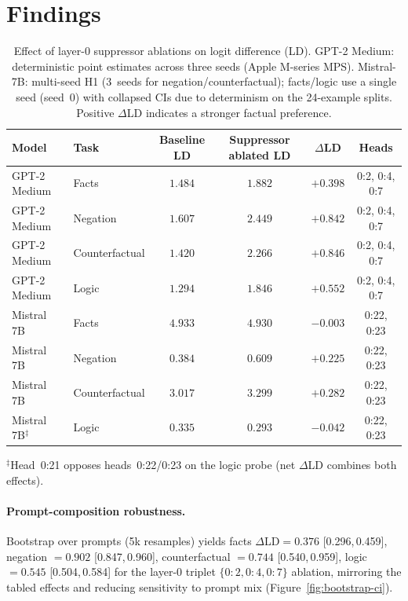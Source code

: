 \section{Findings}\label{sec:findings}

\begin{table}[t]
    \centering
    \caption{Effect of layer-0 suppressor ablations on logit difference (LD). GPT-2 Medium: deterministic point estimates across three seeds (Apple M-series MPS). Mistral-7B: multi-seed H1 (3~seeds for negation/counterfactual); facts/logic use a single seed (seed~0) with collapsed CIs due to determinism on the 24-example splits. Positive $\Delta$LD indicates a stronger factual preference.}
    \label{tab:impact}
    \begin{tabular}{llcccc}
        \toprule
        Model & Task & Baseline LD & Suppressor ablated LD & $\Delta$LD & Heads \\
        \midrule
        GPT-2 Medium & Facts          & $1.484$ & $1.882$ & $+0.398$ & 0:2, 0:4, 0:7 \\
        GPT-2 Medium & Negation       & $1.607$ & $2.449$ & $+0.842$ & 0:2, 0:4, 0:7 \\
        GPT-2 Medium & Counterfactual & $1.420$ & $2.266$ & $+0.846$ & 0:2, 0:4, 0:7 \\
        GPT-2 Medium & Logic          & $1.294$ & $1.846$ & $+0.552$ & 0:2, 0:4, 0:7 \\
        \addlinespace
        Mistral 7B   & Facts          & $4.933$ & $4.930$ & $-0.003$ & 0:22, 0:23 \\
        Mistral 7B   & Negation       & $0.384$ & $0.609$ & $+0.225$ & 0:22, 0:23 \\
        Mistral 7B   & Counterfactual & $3.017$ & $3.299$ & $+0.282$ & 0:22, 0:23 \\
        Mistral 7B$^{\ddagger}$   & Logic          & $0.335$ & $0.293$ & $-0.042$ & 0:22, 0:23 \\
        \bottomrule
    \end{tabular}
    \vspace{0.5em}
    \footnotesize{$^{\ddagger}$Head~0:21 opposes heads~0:22/0:23 on the logic probe (net $\Delta$LD combines both effects).}
\end{table}

\paragraph{Prompt-composition robustness.}
Bootstrap over prompts (5k resamples) yields facts $\Delta$LD$=0.376$ [0.296,\,0.459], negation $=0.902$ [0.847,\,0.960], counterfactual $=0.744$ [0.540,\,0.959], logic $=0.545$ [0.504,\,0.584] for the layer-0 triplet $\{0{:}2,0{:}4,0{:}7\}$ ablation, mirroring the tabled effects and reducing sensitivity to prompt mix (Figure~\ref{fig:bootstrap-ci}).

